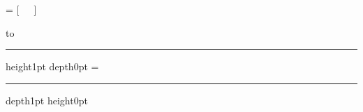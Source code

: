 \ifx\undefined\eplain  \fi


\nopagenumbers
\headline = {\rm \timestamp \hfil
             {\tt \epsname} [\epsfllx\ \epsflly\ \epsfurx\ \epsfury]}

\def\fooepsfsize#1#2{%
  \dimen0 = \hsize
    \advance\dimen0 by -#1\relax
  \dimen2 = \vsize
    \advance\dimen2 by -#2\relax
  \ifdim\dimen0 < 0pt
    \ifdim\dimen2 < 0pt
}

 to \epsname

\hrule height1pt depth0pt
\epsfxsize = \hsize
\epsfbox{\epsname}
\hrule depth1pt height0pt

\bye

